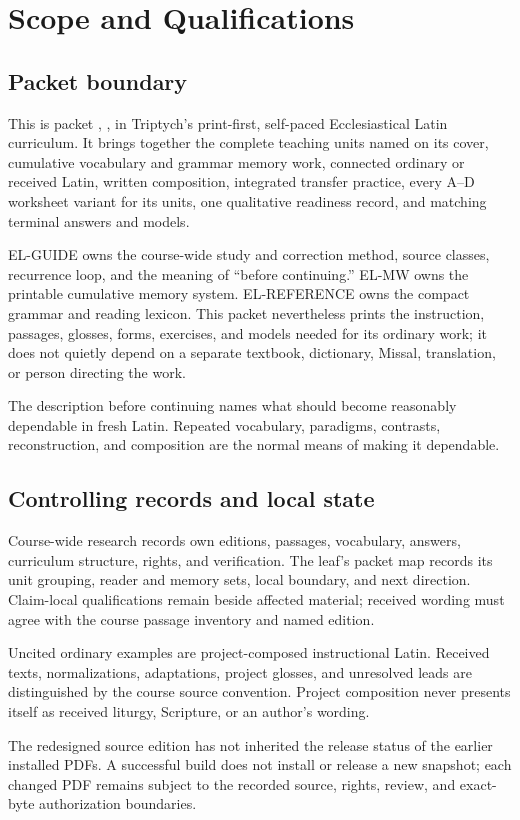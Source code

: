 \chapter{Scope and Qualifications}

\section{Packet boundary}

This is packet \ModuleID, \emph{\ModuleTitle}, in Triptych's print-first,
self-paced Ecclesiastical Latin curriculum.  It brings together the complete
teaching units named on its cover, cumulative vocabulary and grammar memory
work, connected ordinary or received Latin, written composition, integrated
transfer practice, every A--D worksheet variant for its units, one qualitative
readiness record, and matching terminal answers and models.
\ModuleScopeNote

EL-GUIDE owns the course-wide study and correction method, source classes,
recurrence loop, and the meaning of ``before continuing.''  EL-MW owns the
printable cumulative memory system.  EL-REFERENCE owns the compact grammar and
reading lexicon.  This packet nevertheless prints the instruction, passages,
glosses, forms, exercises, and models needed for its ordinary work; it does not
quietly depend on a separate textbook, dictionary, Missal, translation, or
person directing the work.

The description before continuing names what should become reasonably
dependable in fresh Latin.  Repeated vocabulary, paradigms, contrasts,
reconstruction, and composition are the normal means of making it dependable.

\section{Controlling records and local state}

Course-wide research records own editions, passages, vocabulary, answers,
curriculum structure, rights, and verification.  The leaf's packet map records
its unit grouping, reader and memory sets, local boundary, and next direction.
Claim-local qualifications remain beside affected material; received wording
must agree with the course passage inventory and named edition.

Uncited ordinary examples are project-composed instructional Latin.  Received
texts, normalizations, adaptations, project glosses, and unresolved leads are
distinguished by the course source convention.  Project composition never
presents itself as received liturgy, Scripture, or an author's wording.

The redesigned source edition has not inherited the release status of the
earlier installed PDFs.  A successful build does not install or release a new
snapshot; each changed PDF remains subject to the recorded source, rights,
review, and exact-byte authorization boundaries.
